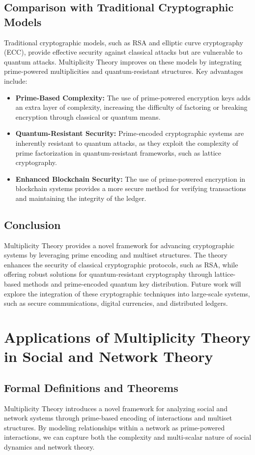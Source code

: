 \documentclass[%
 preprint, linenumbers,
 amsmath,amssymb,
 aps, physrev,
]{revtex4-2}
\begin{document}
\subsection{Comparison with Traditional Cryptographic Models}
Traditional cryptographic models, such as RSA and elliptic curve cryptography (ECC), provide effective security against classical attacks but are vulnerable to quantum attacks. Multiplicity Theory improves on these models by integrating prime-powered multiplicities and quantum-resistant structures. Key advantages include:
\begin{itemize}
    \item \textbf{Prime-Based Complexity:} The use of prime-powered encryption keys adds an extra layer of complexity, increasing the difficulty of factoring or breaking encryption through classical or quantum means.
    \item \textbf{Quantum-Resistant Security:} Prime-encoded cryptographic systems are inherently resistant to quantum attacks, as they exploit the complexity of prime factorization in quantum-resistant frameworks, such as lattice cryptography.
    \item \textbf{Enhanced Blockchain Security:} The use of prime-powered encryption in blockchain systems provides a more secure method for verifying transactions and maintaining the integrity of the ledger.
\end{itemize}

\subsection{Conclusion}
Multiplicity Theory provides a novel framework for advancing cryptographic systems by leveraging prime encoding and multiset structures. The theory enhances the security of classical cryptographic protocols, such as RSA, while offering robust solutions for quantum-resistant cryptography through lattice-based methods and prime-encoded quantum key distribution. Future work will explore the integration of these cryptographic techniques into large-scale systems, such as secure communications, digital currencies, and distributed ledgers.
\section{Applications of Multiplicity Theory in Social and Network Theory}
\label{sec:SocialNetworkTheory}

\subsection{Formal Definitions and Theorems}
Multiplicity Theory introduces a novel framework for analyzing social and network systems through prime-based encoding of interactions and multiset structures. By modeling relationships within a network as prime-powered interactions, we can capture both the complexity and multi-scalar nature of social dynamics and network theory.
\end{document}
